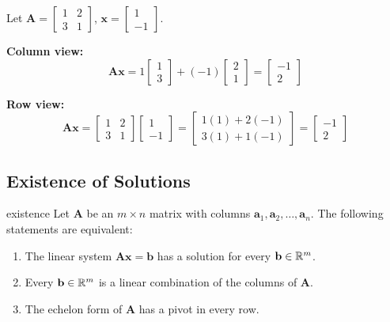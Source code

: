 \begin{example}
  Let $\mathbf{A} =
    \begin{bmatrix}
      1 & 2 \\ 3 & 1
    \end{bmatrix}
  $,
  $\mathbf{x} =
    \begin{bmatrix}
      1 \\ -1
    \end{bmatrix}
  $.

  \textbf{Column view:}
  \[
    \mathbf{A}\mathbf{x}
    = 1
    \begin{bmatrix}
      1 \\ 3
    \end{bmatrix}
    + (-1)
    \begin{bmatrix}
      2 \\ 1
    \end{bmatrix}
    =
    \begin{bmatrix}
      -1 \\ 2
    \end{bmatrix}
  \]

  \textbf{Row view:}
  \[
    \mathbf{A}\mathbf{x}
    =
    \begin{bmatrix}
      1 & 2 \\ 3 & 1
    \end{bmatrix}
    \begin{bmatrix}
      1 \\ -1
    \end{bmatrix}
    =
    \begin{bmatrix}
      1(1) + 2(-1) \\ 3(1) + 1(-1)
    \end{bmatrix}
    =
    \begin{bmatrix}
      -1 \\ 2
    \end{bmatrix}
  \]
\end{example}

\subsection{Existence of Solutions}

\begin{theorem}{}{existence}
  Let $\mathbf{A}$ be an $m \times n$ matrix with columns $\mathbf{a}_1, \mathbf{a}_2, \ldots, \mathbf{a}_n$. The following statements are equivalent:
  \begin{enumerate}
    \item The linear system $\mathbf{A}\mathbf{x} = \mathbf{b}$ has a solution for every $\mathbf{b} \in \mathbb{R}^m$.
    \item Every $\mathbf{b} \in \mathbb{R}^m$ is a linear combination of the columns of $\mathbf{A}$.
    \item The echelon form of $\mathbf{A}$ has a pivot in every row.
  \end{enumerate}
\end{theorem}

